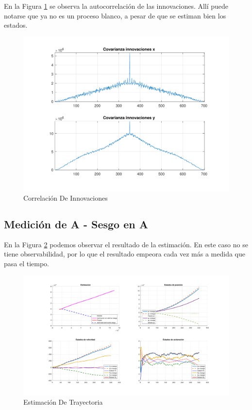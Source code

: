 	En la Figura \ref{fig:ej4d_cov} se observa la autocorrelación de las innovaciones. Allí puede notarse que ya no es un proceso blanco, a pesar de que se estiman bien los estados.
	
	\begin{figure}[H]
		\centering
		\includegraphics[width=1.0\textwidth,keepaspectratio]{Figuras/covinn_ej4d.pdf}
		\caption{Correlación De Innovaciones}
		\label{fig:ej4d_cov}
	\end{figure}


\subsection{Medición de A - Sesgo en A}

	En la Figura \ref{fig:ej4e} podemos observar el resultado de la estimación. En este caso no se tiene observabilidad, por lo que el resultado empeora cada vez más a medida que pasa el tiempo.

	\begin{figure}[H]
		\centering
		\includegraphics[scale=0.5,trim={6,5cm 0 0 0}]{Figuras/graf_ej4e.pdf}
		\caption{Estimación De Trayectoria}
		\label{fig:ej4e}
	\end{figure}
	
